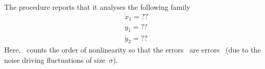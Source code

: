 The procedure reports that it analyses the following family 
\begin{align*}&
\dot x_{1}=??
\\&
\dot y_{1}=??
\\&
\dot y_{2}=??
\end{align*}
Here, \eps\ counts the order of nonlinearity so that the errors~ are errors~ (due to the noise driving fluctuations of size~\(\sigma\)).



